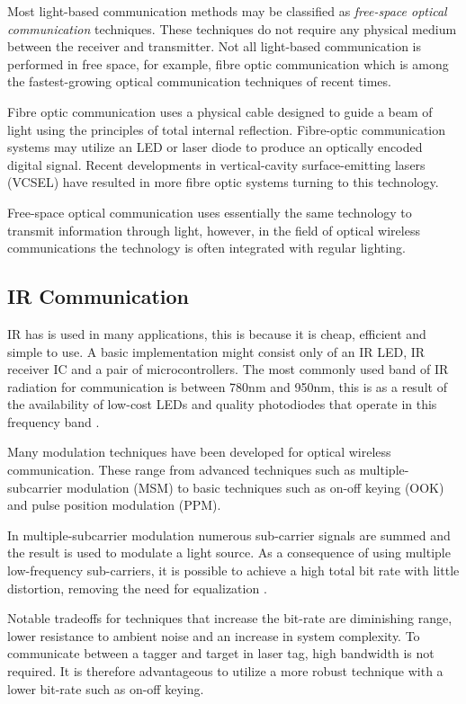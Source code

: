 Most light-based communication methods may be classified as \textit{free-space optical communication} techniques. These techniques do not require any physical medium between the receiver and transmitter. Not all light-based communication is performed in free space, for example, fibre optic communication which is among the fastest-growing optical communication techniques of recent times.

Fibre optic communication uses a physical cable designed to guide a beam of light using the principles of total internal reflection. Fibre-optic communication systems may utilize an LED or laser diode to produce an optically encoded digital signal. Recent developments in vertical-cavity surface-emitting lasers (VCSEL) have resulted in more fibre optic systems turning to this technology.

Free-space optical communication uses essentially the same technology to transmit information through light, however, in the field of optical wireless communications the technology is often integrated with regular lighting.

\subsection{IR Communication}

IR has is used in many applications, this is because it is cheap, efficient and simple to use. A basic implementation might consist only of an IR LED, IR receiver IC and a pair of microcontrollers. The most commonly used band of IR radiation for communication is between 780nm and 950nm, this is as a result of the availability of low-cost LEDs and quality photodiodes that operate in this frequency band \cite{Elgala2011}.

Many modulation techniques have been developed for optical wireless communication. These range from advanced techniques such as multiple-subcarrier modulation (MSM) to basic techniques such as on-off keying (OOK) and pulse position modulation (PPM).

In multiple-subcarrier modulation numerous sub-carrier signals are summed and the result is used to modulate a light source. As a consequence of using multiple low-frequency sub-carriers, it is possible to achieve a high total bit rate with little distortion, removing the need for equalization \cite{Ohtsuki2003}.

Notable tradeoffs for techniques that increase the bit-rate are diminishing range, lower resistance to ambient noise and an increase in system complexity. To communicate between a tagger and target in laser tag, high bandwidth is not required. It is therefore advantageous to utilize a more robust technique with a lower bit-rate such as on-off keying.

